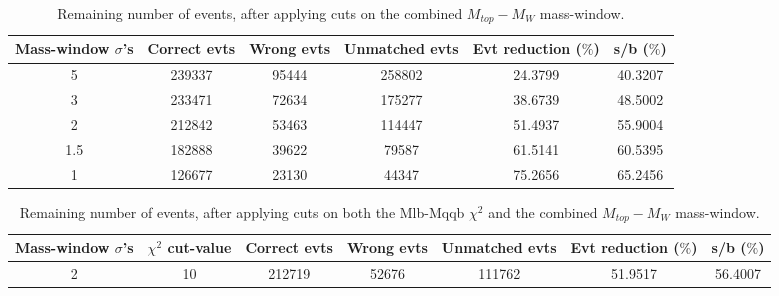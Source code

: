 \documentclass{article}
\begin{document}
 \begin{table}[h!t] 
  \caption{Remaining number of events, after applying cuts on the combined $M_{top}-M_{W}$ mass-window.} 
  \centering 
   \begin{tabular}{c|c|c|c|c|c} 
     Mass-window $\sigma$'s & Correct evts    & Wrong evts     & Unmatched evts  & Evt reduction ($\%$)   & s/b ($\%$)     \\ 
     \hline
     5 & 239337  &  95444  &   258802 & 24.3799 &  40.3207 \\ 
     3 & 233471  &  72634  &   175277 & 38.6739 &  48.5002 \\ 
     2 & 212842  &  53463  &   114447 & 51.4937 &  55.9004 \\ 
     1.5 & 182888  &  39622  &   79587 & 61.5141 &  60.5395 \\ 
     1 & 126677  &  23130  &   44347 & 75.2656 &  65.2456
   \end{tabular} 
 \end{table} 
 
 \begin{table}[h!t] 
  \caption{Remaining number of events, after applying cuts on both the Mlb-Mqqb $\chi^{2}$ and the combined $M_{top}-M_{W}$ mass-window.} 
  \centering 
   \begin{tabular}{c|c|c|c|c|c|c} 
     Mass-window $\sigma$'s & $\chi^{2}$ cut-value    & Correct evts    & Wrong evts     & Unmatched evts  & Evt reduction ($\%$)    & s/b ($\%$)     \\ 
     \hline
     2 & 10 & 212719 & 52676 & 111762 & 51.9517 & 56.4007

   \end{tabular} 
 \end{table} 
 
\end{document}
